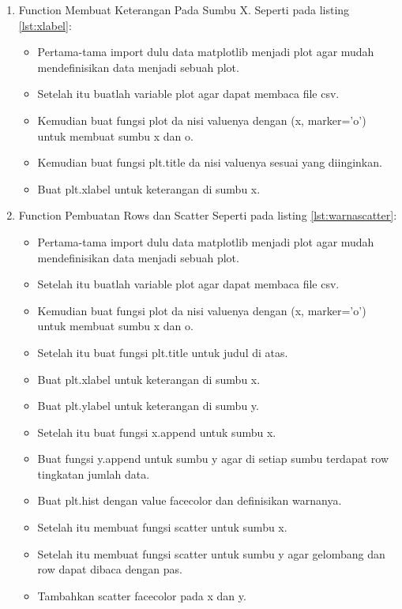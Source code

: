 \begin{enumerate}
\item Function Membuat Keterangan Pada Sumbu X.
Seperti pada listing \ref{lst:xlabel}:

\begin{itemize}
\item Pertama-tama import dulu data matplotlib menjadi plot agar mudah mendefinisikan data menjadi sebuah plot. 
\item Setelah itu buatlah variable plot agar dapat membaca file csv.
\item Kemudian buat fungsi plot da nisi valuenya dengan (x, marker=’o’) untuk membuat sumbu x dan o.
\item Kemudian buat fungsi plt.title da nisi valuenya sesuai yang diinginkan.
\item Buat plt.xlabel untuk keterangan di sumbu x.
\end{itemize}

\item Function Pembuatan Rows dan Scatter 
Seperti pada listing \ref{lst:warnascatter}:

\begin{itemize}
\item Pertama-tama import dulu data matplotlib menjadi plot agar mudah mendefinisikan data menjadi sebuah plot. 
\item Setelah itu buatlah variable plot agar dapat membaca file csv.
\item Kemudian buat fungsi plot da nisi valuenya dengan (x, marker=’o’) untuk membuat sumbu x dan o.
\item Setelah itu buat fungsi plt.title untuk judul di atas.
\item Buat plt.xlabel untuk keterangan di sumbu x.
\item Buat plt.ylabel untuk keterangan di sumbu y.
\item Setelah itu buat fungsi x.append untuk sumbu x.
\item Buat fungsi y.append untuk sumbu y agar di setiap sumbu terdapat row tingkatan jumlah data.
\item Buat plt.hist dengan value facecolor dan definisikan warnanya.
\item Setelah itu membuat fungsi scatter untuk sumbu x.
\item Setelah itu membuat fungsi scatter untuk sumbu y agar gelombang dan row dapat dibaca dengan pas.
\item Tambahkan scatter facecolor pada x dan y.
\end{itemize}
\end{enumerate}

